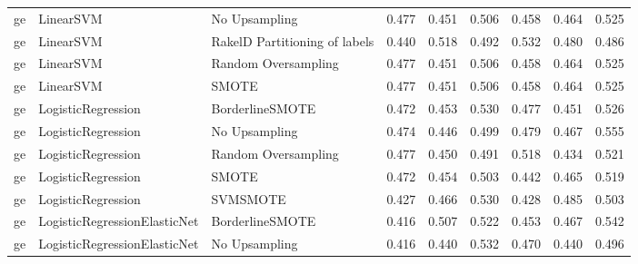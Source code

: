 \begin{tabular}{lllllllll}
      ge &                       LinearSVM &                 No Upsampling & 0.477 &                     0.451 &                 0.506 &                  0.458 &                                   0.464 &     0.525 \\
      ge &                       LinearSVM & RakelD Partitioning of labels & 0.440 &                     0.518 &                 0.492 &                  0.532 &                                   0.480 &     0.486 \\
      ge &                       LinearSVM &           Random Oversampling & 0.477 &                     0.451 &                 0.506 &                  0.458 &                                   0.464 &     0.525 \\
      ge &                       LinearSVM &                         SMOTE & 0.477 &                     0.451 &                 0.506 &                  0.458 &                                   0.464 &     0.525 \\
      ge &              LogisticRegression &               BorderlineSMOTE & 0.472 &                     0.453 &                 0.530 &                  0.477 &                                   0.451 &     0.526 \\
      ge &              LogisticRegression &                 No Upsampling & 0.474 &                     0.446 &                 0.499 &                  0.479 &                                   0.467 &     0.555 \\
      ge &              LogisticRegression &           Random Oversampling & 0.477 &                     0.450 &                 0.491 &                  0.518 &                                   0.434 &     0.521 \\
      ge &              LogisticRegression &                         SMOTE & 0.472 &                     0.454 &                 0.503 &                  0.442 &                                   0.465 &     0.519 \\
      ge &              LogisticRegression &                      SVMSMOTE & 0.427 &                     0.466 &                 0.530 &                  0.428 &                                   0.485 &     0.503 \\
      ge &    LogisticRegressionElasticNet &               BorderlineSMOTE & 0.416 &                     0.507 &                 0.522 &                  0.453 &                                   0.467 &     0.542 \\
      ge &    LogisticRegressionElasticNet &                 No Upsampling & 0.416 &                     0.440 &                 0.532 &                  0.470 &                                   0.440 &     0.496 \\

\end{tabular}
